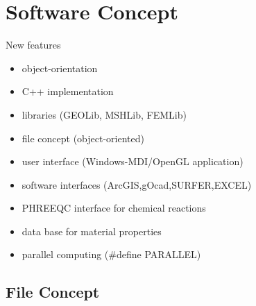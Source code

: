 \section{Software Concept}

New features
\begin{itemize}
 \item object-orientation
 \item C++ implementation
 \item libraries (GEOLib, MSHLib, FEMLib)
 \item file concept (object-oriented)
 \item user interface (Windows-MDI/OpenGL application)
 \item software interfaces (ArcGIS,gOcad,SURFER,EXCEL)
 \item PHREEQC interface for chemical reactions
 \item data base for material properties
 \item parallel computing (\#define PARALLEL)
\end{itemize}


\subsection{File Concept}

